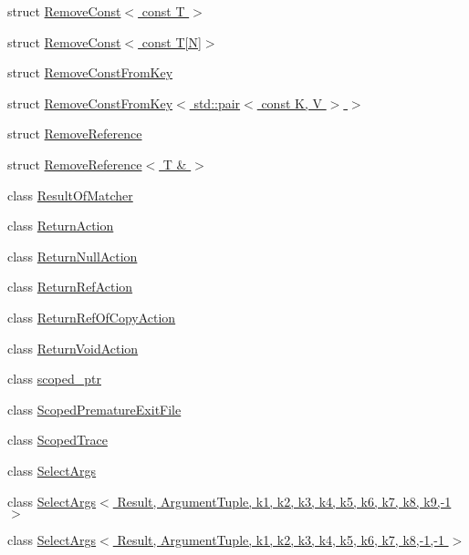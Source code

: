 \begin{DoxyCompactItemize}
struct \hyperlink{structtesting_1_1internal_1_1RemoveConst_3_01const_01T_01_4}{Remove\+Const$<$ const T $>$}
\item 
struct \hyperlink{structtesting_1_1internal_1_1RemoveConst_3_01const_01T[N]_4}{Remove\+Const$<$ const T\mbox{[}\+N\mbox{]}$>$}
\item 
struct \hyperlink{structtesting_1_1internal_1_1RemoveConstFromKey}{Remove\+Const\+From\+Key}
\item 
struct \hyperlink{structtesting_1_1internal_1_1RemoveConstFromKey_3_01std_1_1pair_3_01const_01K_00_01V_01_4_01_4}{Remove\+Const\+From\+Key$<$ std\+::pair$<$ const K, V $>$ $>$}
\item 
struct \hyperlink{structtesting_1_1internal_1_1RemoveReference}{Remove\+Reference}
\item 
struct \hyperlink{structtesting_1_1internal_1_1RemoveReference_3_01T_01_6_01_4}{Remove\+Reference$<$ T \& $>$}
\item 
class \hyperlink{classtesting_1_1internal_1_1ResultOfMatcher}{Result\+Of\+Matcher}
\item 
class \hyperlink{classtesting_1_1internal_1_1ReturnAction}{Return\+Action}
\item 
class \hyperlink{classtesting_1_1internal_1_1ReturnNullAction}{Return\+Null\+Action}
\item 
class \hyperlink{classtesting_1_1internal_1_1ReturnRefAction}{Return\+Ref\+Action}
\item 
class \hyperlink{classtesting_1_1internal_1_1ReturnRefOfCopyAction}{Return\+Ref\+Of\+Copy\+Action}
\item 
class \hyperlink{classtesting_1_1internal_1_1ReturnVoidAction}{Return\+Void\+Action}
\item 
class \hyperlink{classtesting_1_1internal_1_1scoped__ptr}{scoped\+\_\+ptr}
\item 
class \hyperlink{classtesting_1_1internal_1_1ScopedPrematureExitFile}{Scoped\+Premature\+Exit\+File}
\item 
class \hyperlink{classtesting_1_1internal_1_1ScopedTrace}{Scoped\+Trace}
\item 
class \hyperlink{classtesting_1_1internal_1_1SelectArgs}{Select\+Args}
\item 
class \hyperlink{classtesting_1_1internal_1_1SelectArgs_3_01Result_00_01ArgumentTuple_00_01k1_00_01k2_00_01k3_00_6cec9358efe806d84292a8e378f8b1d2}{Select\+Args$<$ Result, Argument\+Tuple, k1, k2, k3, k4, k5, k6, k7, k8, k9,-\/1 $>$}
\item 
class \hyperlink{classtesting_1_1internal_1_1SelectArgs_3_01Result_00_01ArgumentTuple_00_01k1_00_01k2_00_01k3_00_9d4b115de35df33f8c94d8d1b36790c1}{Select\+Args$<$ Result, Argument\+Tuple, k1, k2, k3, k4, k5, k6, k7, k8,-\/1,-\/1 $>$}

\end{DoxyCompactItemize}

